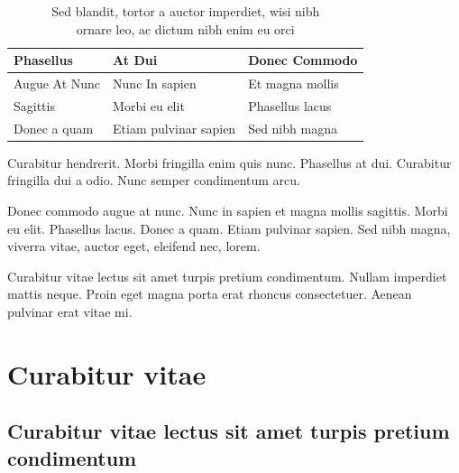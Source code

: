 \documentclass[cfonts]{nostarch}
\begin{document}
\begin{table}[tp]
  \caption[Sed blandit, tortor a auctor]{Sed blandit, tortor a auctor
    imperdiet, wisi nibh\\ ornare leo, 
    ac dictum nibh enim eu orci}
  \tbfont
  \begin{tabular}{@{}lll}
    \toprule\let\normalfont=\bfseries%
    \thfont Phasellus &  \thfont At Dui       & \thfont Donec Commodo \\
    \midrule    
     Augue At Nunc    & Nunc In  sapien       & Et magna mollis \\
     Sagittis         &  Morbi eu elit        &  Phasellus lacus\\
     Donec a quam     & Etiam pulvinar sapien & Sed nibh magna\\
    \bottomrule
  \end{tabular}
\label{tab:one}
\end{table}

\lipsum[60]

Curabitur hendrerit. Morbi fringilla enim
  quis nunc. Phasellus at dui. Curabitur fringilla dui a odio.
  Nunc semper condimentum arcu. 
\begin{note}
  Donec commodo augue at nunc. Nunc in sapien et magna mollis
  sagittis. Morbi eu elit. Phasellus lacus.  Donec a quam. Etiam
  pulvinar sapien. Sed nibh magna, viverra vitae, auctor eget,
  eleifend nec, lorem.
\end{note}
Curabitur vitae lectus sit amet turpis pretium condimentum. Nullam
imperdiet mattis neque. Proin eget magna porta erat rhoncus
consectetuer. Aenean pulvinar erat vitae mi.

\part{Curabitur vitae}

\chapter[Curabitur vitae lectus]{Curabitur vitae lectus sit amet
  turpis pretium condimentum}{}

\lipsum[43-48]
\end{document}
